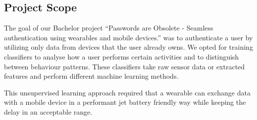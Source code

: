 \subsection{Project Scope}
\label{sec:intro:scope}
The goal of our Bachelor project ``Passwords are Obsolete - Seamless authentication using wearables and mobile devices.'' was to authenticate a user by utilizing only data from devices that the user already owns.
We opted for training classifiers to analyse how a user performs certain activities and to distinguish between behaviour patterns. These classifiers take raw sensor data or extracted features and perform different machine learning methods.

This unsupervised learning approach required that a wearable can exchange data with a mobile device in a performant jet battery friendly way while keeping the delay in an acceptable range.

\clearpage